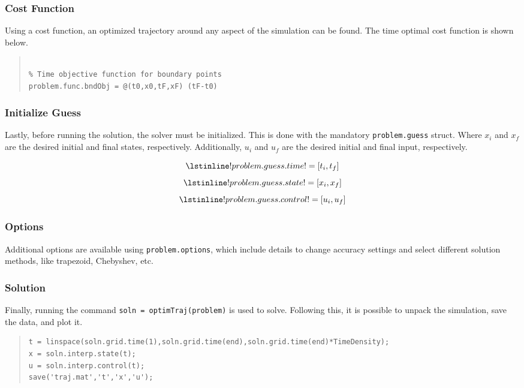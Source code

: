 \documentclass[12pt]{article}
\begin{document}
\subsubsection{Cost Function}
Using a cost function, an optimized trajectory around any aspect of the simulation can be found. The time optimal cost function is shown below.
\begin{quote}
\begin{lstlisting}

% Time objective function for boundary points
problem.func.bndObj = @(t0,x0,tF,xF) (tF-t0)

\end{lstlisting}
\end{quote}

\clearpage

\subsubsection{Initialize Guess}
Lastly, before running the solution, the solver must be initialized. This is done with the mandatory \lstinline!problem.guess! struct. Where $x_{i}$ and $x_{f}$ are the desired initial and final states, respectively. Additionally, $u_{i}$ and $u_{f}$ are the desired initial and final input, respectively. 

\begin{figure}[H]
\begin{equation*}
\lstinline!problem.guess.time! = [t_{i}, t_{f}]
\end{equation*}
\begin{equation*}
\lstinline!problem.guess.state! = [x_{i}, x_{f}]
\end{equation*}
\begin{equation*}
\lstinline!problem.guess.control! = [u_{i}, u_{f}] 
\end{equation*}
\end{figure}
\subsubsection{Options}
Additional options are available using \lstinline!problem.options!, which include details to change accuracy settings and select different solution methods, like trapezoid, Chebyshev, etc.
\subsubsection{Solution}
Finally, running the command \lstinline!soln = optimTraj(problem)! is used to solve. Following this, it is possible to unpack the simulation, save the data, and plot it.
\begin{quote}
\begin{lstlisting}
t = linspace(soln.grid.time(1),soln.grid.time(end),soln.grid.time(end)*TimeDensity);
x = soln.interp.state(t);
u = soln.interp.control(t);
save('traj.mat','t','x','u');
\end{lstlisting}
\end{quote}
\end{document}

